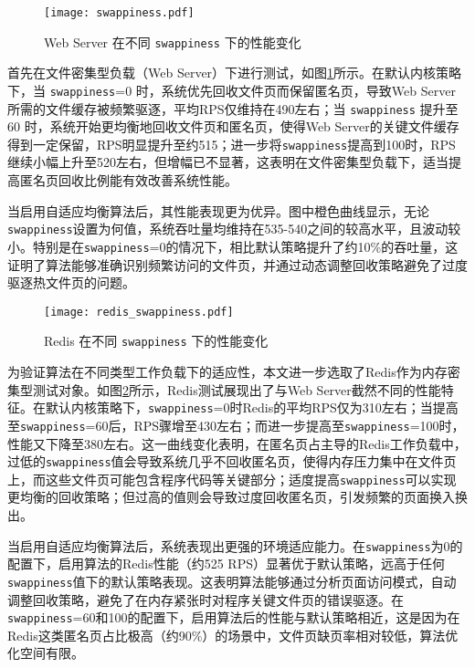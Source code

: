 \begin{figure}[htbp]
    \centering
    \texttt{[image: swappiness.pdf]}
    \caption{Web Server 在不同 \texttt{swappiness} 下的性能变化}
    \label{fig:web_server_swappiness}
\end{figure}

首先在文件密集型负载（Web Server）下进行测试，如图\ref{fig:web_server_swappiness}所示。在默认内核策略下，当 \texttt{swappiness}=0 时，系统优先回收文件页而保留匿名页，导致Web Server所需的文件缓存被频繁驱逐，平均RPS仅维持在490左右；当 \texttt{swappiness} 提升至 60 时，系统开始更均衡地回收文件页和匿名页，使得Web Server的关键文件缓存得到一定保留，RPS明显提升至约515；进一步将\texttt{swappiness}提高到100时，RPS继续小幅上升至520左右，但增幅已不显著，这表明在文件密集型负载下，适当提高匿名页回收比例能有效改善系统性能。

当启用自适应均衡算法后，其性能表现更为优异。图中橙色曲线显示，无论\texttt{swappiness}设置为何值，系统吞吐量均维持在535-540之间的较高水平，且波动较小。特别是在\texttt{swappiness}=0的情况下，相比默认策略提升了约10\%的吞吐量，这证明了算法能够准确识别频繁访问的文件页，并通过动态调整回收策略避免了过度驱逐热文件页的问题。

\begin{figure}[htbp]
    \centering
    \texttt{[image: redis\_swappiness.pdf]}
    \caption{Redis 在不同 \texttt{swappiness} 下的性能变化}
    \label{fig:redis_swappiness}
\end{figure}

为验证算法在不同类型工作负载下的适应性，本文进一步选取了Redis作为内存密集型测试对象。如图\ref{fig:redis_swappiness}所示，Redis测试展现出了与Web Server截然不同的性能特征。在默认内核策略下，\texttt{swappiness}=0时Redis的平均RPS仅为310左右；当提高至\texttt{swappiness}=60后，RPS骤增至430左右；而进一步提高至\texttt{swappiness}=100时，性能又下降至380左右。这一曲线变化表明，在匿名页占主导的Redis工作负载中，过低的\texttt{swappiness}值会导致系统几乎不回收匿名页，使得内存压力集中在文件页上，而这些文件页可能包含程序代码等关键部分；适度提高\texttt{swappiness}可以实现更均衡的回收策略；但过高的值则会导致过度回收匿名页，引发频繁的页面换入换出。

当启用自适应均衡算法后，系统表现出更强的环境适应能力。在\texttt{swappiness}为0的配置下，启用算法的Redis性能（约525 RPS）显著优于默认策略，远高于任何\texttt{swappiness}值下的默认策略表现。这表明算法能够通过分析页面访问模式，自动调整回收策略，避免了在内存紧张时对程序关键文件页的错误驱逐。在\texttt{swappiness}=60和100的配置下，启用算法后的性能与默认策略相近，这是因为在Redis这类匿名页占比极高（约90\%）的场景中，文件页缺页率相对较低，算法优化空间有限。

